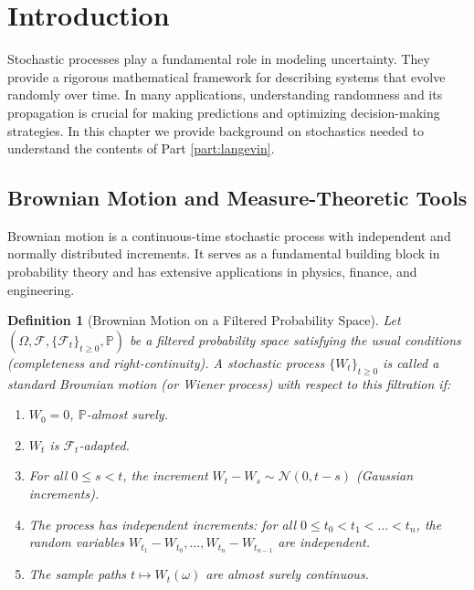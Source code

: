 \documentclass[11pt, twoside]{report}
\newtheorem{definition}[theorem]{Definition}
\begin{document}
\section{Introduction}
Stochastic processes play a fundamental role in modeling uncertainty. They provide a rigorous mathematical framework for describing systems that evolve randomly over time. In many applications, understanding randomness and its propagation is crucial for making predictions and optimizing decision-making strategies. In this chapter we provide background on stochastics needed to understand the contents of Part \ref{part:langevin}.





\subsection{Brownian Motion and Measure-Theoretic Tools}
Brownian motion is a continuous-time stochastic process with independent and normally distributed increments. It serves as a fundamental building block in probability theory and has extensive applications in physics, finance, and engineering.

\begin{definition}[Brownian Motion on a Filtered Probability Space]
Let $(\Omega, \mathcal{F}, \{\mathcal{F}_t\}_{t \geq 0}, \mathbb{P})$ be a filtered probability space satisfying the usual conditions (completeness and right-continuity). A stochastic process $\{W_t\}_{t \geq 0}$ is called a \emph{standard Brownian motion} (or \emph{Wiener process}) with respect to this filtration if:

\begin{enumerate}
    \item $W_0 = 0$, $\mathbb{P}$-almost surely.
    \item $W_t$ is $\mathcal{F}_t$-adapted.
    \item For all $0 \leq s < t$, the increment $W_t - W_s \sim \mathcal{N}(0, t-s)$ (Gaussian increments).
    \item The process has independent increments: for all $0 \le t_0 < t_1 < \dots < t_n$, the random variables $W_{t_1} - W_{t_0}, \dots, W_{t_n} - W_{t_{n-1}}$ are independent.
    \item The sample paths $t \mapsto W_t(\omega)$ are almost surely continuous.
\end{enumerate}
\end{definition}
\end{document}
